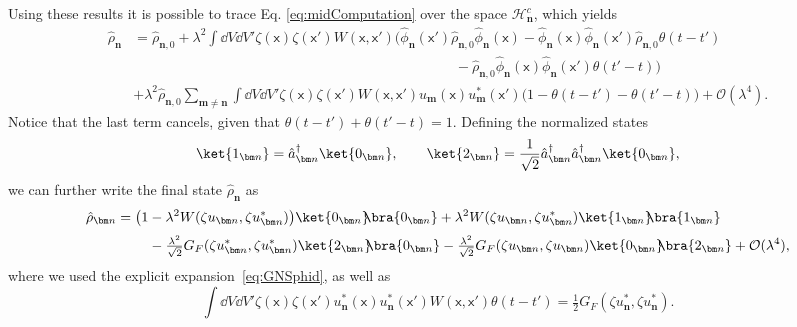 \documentclass[letterpaper,12pt,titlepage,oneside,final]{book}
\newcommand{\mf}{\mathsf}%
\renewcommand{\r}{\hat{\rho}}
\begin{document}
    Using these results it is possible to trace Eq. \eqref{eq:midComputation} over the space $\mathscr{H}_{\bm n}^c$, which yields
    \begin{align}
        \!\!\!\r_{\bm n}\!&=\!\hat{\rho}_{\bm n,0} + \lambda^2 \!\int\! \dd V \dd V'\zeta(\mf x) \zeta(\mf x')W(\mf x, \mf x')
        \Big(\hat{\phi}_{\bm n}(\mf x')\r_{{\bm n},0}\hat{\phi}_{\bm n}(\mf x) \label{eq:finalRhoQFTPD}-\hat{\phi}_{\bm n}(\mf x)\hat{\phi}_{\bm n}(\mf x')  \r_{\bm n,0}\theta(t-t')\\
        &\:\:\:\:\:\:\:\:\:\:\:\:\:\:\:\:\:\:\:\:\:\:\:\:\:\:\:\:\:\:\:\:\:\:\:\:\:\:\:\:\:\:\:\:\:\:\:\:\:\:\:\:\:\:\:\:\:\:\:\:\:\:\:\:\:\:\:\:\:\:\:\:\:\:\:\:\:\:\:\:\:\:\:\:\:\:\:\:\:\:\:\:\:\:\:\:\:\:\:\:\:\:\:\:-\r_{{\bm n},0} \hat{\phi}_{\bm n}(\mf x)\hat{\phi}_{\bm n}(\mf x')\theta(t'-t) \Big)\nonumber\\
        &+\lambda^2 \r_{{\bm n},0}\sum_{\bm m\neq \bm n}\int \dd V \dd V' \zeta(\mf x) \zeta(\mf x')W(\mf x, \mf x')  u_{\bm m} (\mf x)u^*_{\bm m}(\mf x') \big( 1- \theta(t-t') - \theta(t'-t)\big) + \mathcal{O}(\lambda^4).\nonumber
    \end{align}
    Notice that the last term cancels, given that \mbox{$\theta(t-t') + \theta(t'-t) = 1$}. Defining the normalized states
    \begin{align}
        \ket{1_{\bm n}} = \hat{a}_{\bm n}^\dagger \ket{0_{\bm n}}, \quad\quad \ket{2_{\bm n}} = \frac{1}{\sqrt{2}}\hat{a}_{\bm n}^\dagger\hat{a}_{\bm n}^\dagger \ket{0_{\bm n}},
    \end{align}
    we can further write the final state $\hat{\rho}_{\bm n}$ as 
    \begin{align}
        \r_{\bm n} = \big(1 & - \lambda^2 W(\zeta u_{\bm n},\zeta u_{\bm n}^*)\big)\ket{0_{\bm n}}\!\!\bra{0_{\bm n}} + \lambda^2 W(\zeta u_{\bm n},\zeta u_{\bm n}^*)\ket{1_{\bm n}}\!\!\bra{1_{\bm n}} \\[1mm]
        &- \tfrac{\lambda^2}{\sqrt{2}} G_F(\zeta u_{\bm n}^*,\zeta u_{\bm n}^*)\ket{2_{\bm n}}\!\!\bra{0_{\bm n}} - \tfrac{\lambda^2}{\sqrt{2}} G_F(\zeta u_{\bm n},\zeta u_{\bm n})\ket{0_{\bm n}}\!\!\bra{2_{\bm n}} + \mathcal{O}\nonumber(\lambda^4),
    \end{align}
    where we used the explicit expansion~\eqref{eq:GNSphid}, as well as
    \begin{equation}
         \int \dd V \dd V' \zeta(\mf x) \zeta(\mf x') u_{\bm n}^*(\mf x)u_{\bm n}^*(\mf x') W(\mf x, \mf x') \theta(t-t') = \tfrac{1}{2}G_F(\zeta u_{\bm n}^*,\zeta u_{\bm n}^*).
    \end{equation}
    
\end{document}
